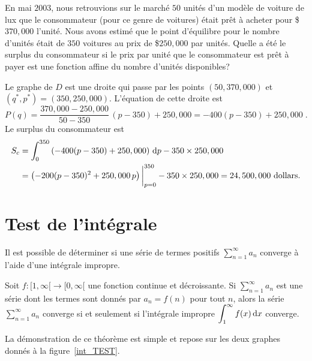 {\begin{egg}
En mai $2003$, nous retrouvions sur le marché $50$ unités d'un
modèle de voiture de lux que le consommateur (pour ce genre de voitures)
était prêt à acheter pour \$$370,000$ l'unité.  Nous avons estimé que le point
d'équilibre pour le nombre d'unités était de $350$ voitures au prix de
\$$250,000$ par unités.  Quelle a été le surplus du consommateur si le
prix par unité que le consommateur est prêt à payer est une fonction
affine du nombre d'unités disponibles?

Le graphe de $D$ est une droite qui passe par les points
$(50, 370,000)$ et \\
$(q^\ast, p^\ast) = (350, 250,000)$.
L'équation de cette droite est
\[
P(q) = \frac{370,000-250,000}{50-350} \, (p-350) + 250,000
= -400 (p-350) + 250,000 \; .
\]
Le surplus du consommateur est
\begin{align*}
S_c &= \int_0^{350} \left(-400 (p-350) + 250,000\right)\,\mathrm{d}p -
350\times 250,000 \\
&= \left(-200 (p-350)^2 + 250,000 \, p \right)\bigg|_{p=0}^{350}
- 350\times 250,000
= 24,500,000 \text{ dollars}.
\end{align*}
\end{egg}

\section{Test de l'intégrale \eng}\label{integralTest}

Il est possible de déterminer si une série de termes positifs
$\displaystyle \sum_{n=1}^\infty a_n$ converge à l'aide d'une intégrale 
impropre.

\begin{focus}{\thm} 
Soit $f:[1,\infty[\rightarrow [0,\infty[$ une fonction continue et
décroissante.  Si $\displaystyle \sum_{n=1}^\infty a_n$ est une série dont
les termes sont donnés par $a_n = f(n)$ pour tout $n$, alors la série
$\displaystyle \sum_{n=1}^\infty a_n$ converge si et seulement si l'intégrale
impropre $\displaystyle \int_1^\infty f(x)\,\mathrm{d}x$ converge.
\end{focus}

La démonstration de ce théorème est simple et repose sur les deux
graphes donnés à la figure~\ref{int_TEST}.


}
